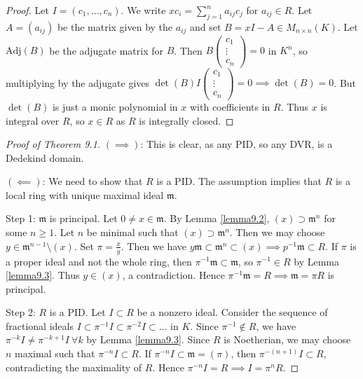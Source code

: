 \documentclass{article}
\theoremstyle{definition}
\begin{document}
\begin{proof}
    Let $I = (c_1,\ldots,c_n)$. We write $xc_i = \sum_{j=1}^{n} a_{ij}c_j$ for $a_{ij} \in R$. Let $A = (a_{ij})$ be the matrix given by the $a_{ij}$ and set $B = xI - A \in M_{n \times n}(K)$. Let $\text{Adj}(B)$ be the adjugate matrix for $B$. Then $B \begin{pmatrix} c_1 \\ \vdots \\ c_n \end{pmatrix} = 0$ in $K^n$, so multiplying by the adjugate gives $\det(B) I \begin{pmatrix} c_1 \\ \vdots \\ c_n \end{pmatrix} = 0 \implies \det(B) = 0$. But $\det(B)$ is just a monic polynomial in $x$ with coefficients in $R$. Thus $x$ is integral over $R$, so $x \in R$ as $R$ is integrally closed.
\end{proof}
\begin{proof}[Proof of Theorem 9.1]
    $(\implies )$: This is clear, as any PID, so any DVR, is a Dedekind domain.
    \vspace{1mm}
     
    $(\impliedby)$: We need to show that $R$ is a PID. The assumption implies that $R$ is a local ring with unique maximal ideal $\mathfrak{m}$. 
    \vspace{1mm}
     
    Step 1: $\mathfrak{m}$ is principal. Let $0 \neq x \in \mathfrak{m}$. By Lemma \ref{lemma9.2}, $(x) \supset \mathfrak{m}^n$ for some $n\ge 1$. Let $n$ be minimal such that $(x) \supset \mathfrak{m}^n$. Then we may choose $y \in \mathfrak{m}^{n-1} \setminus (x)$. Set $\pi = \frac{x}{y}$. Then we have $y \mathfrak{m} \subset \mathfrak{m}^n \subset (x) \implies p^{-1}\mathfrak{m} \subset R$. If $\pi$ is a proper ideal and not the whole ring, then $\pi^{-1} \mathfrak{m} \subset \mathfrak{m}$, so $\pi^{-1} \in R$ by Lemma \ref{lemma9.3}. Thus $y \in (x)$, a contradiction. Hence $\pi^{-1} \mathfrak{m} = R \implies \mathfrak{m} = \pi R$ is principal.
    \vspace{1mm}
     
    Step 2: $R$ is a PID. Let $I \subset R$ be a nonzero ideal. Consider the sequence of fractional ideals $I \subset \pi^{-1} I \subset \pi^{-2} I  \subset \ldots$ in $K$. Since $\pi^{-1} \not\in R$, we have $\pi^{-k}I \neq \pi^{-k+1}I ~\forall k$ by Lemma \ref{lemma9.3}. Since $R$ is Noetherian, we may choose $n$ maximal such that $\pi^{-n} I \subset R$. If $\pi^{-n}I \subset \mathfrak{m} = (\pi)$, then $\pi^{-(n+1)}I \subset R$, contradicting the maximality of $R$. Hence $\pi^{-n} I = R \implies I = \pi^n R$.
\end{proof}
\end{document}
